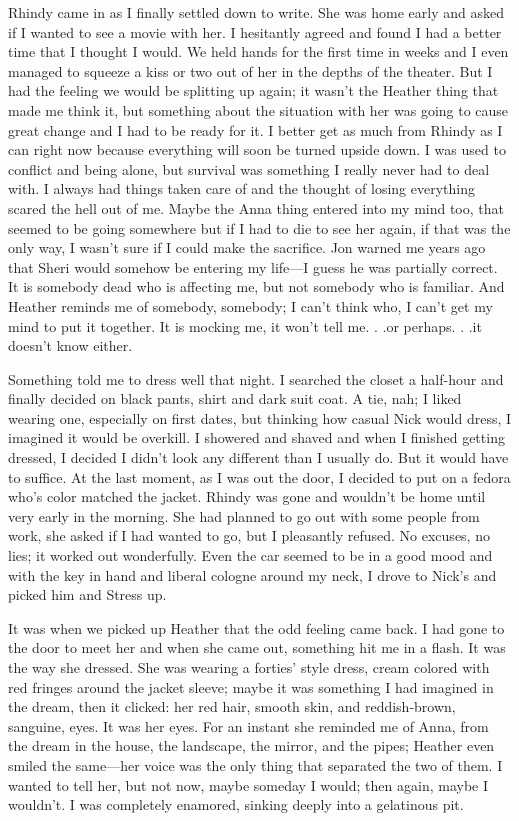 Rhindy came in as I finally settled down to write. She was home early
and asked if I wanted to see a movie with her. I hesitantly agreed and
found I had a better time that I thought I would. We held hands for the
first time in weeks and I even managed to squeeze a kiss or two out of
her in the depths of the theater. But I had the feeling we would be
splitting up again; it wasn't the Heather thing that made me think it,
but something about the situation with her was going to cause great
change and I had to be ready for it. I better get as much from Rhindy as
I can right now because everything will soon be turned upside down. I
was used to conflict and being alone, but survival was something I
really never had to deal with. I always had things taken care of and the
thought of losing everything scared the hell out of me. Maybe the Anna
thing entered into my mind too, that seemed to be going somewhere but if
I had to die to see her again, if that was the only way, I wasn't sure
if I could make the sacrifice. Jon warned me years ago that Sheri would
somehow be entering my life---I guess he was partially correct. It is
somebody dead who is affecting me, but not somebody who is familiar. And
Heather reminds me of somebody, somebody; I can't think who, I can't get
my mind to put it together. It is mocking me, it won't tell me. . .or
perhaps. . .it doesn't know either.

Something told me to dress well that night. I searched the closet a
half-hour and finally decided on black pants, shirt and dark suit coat.
A tie, nah; I liked wearing one, especially on first dates, but thinking
how casual Nick would dress, I imagined it would be overkill. I showered
and shaved and when I finished getting dressed, I decided I didn't look
any different than I usually do. But it would have to suffice. At the
last moment, as I was out the door, I decided to put on a fedora who's
color matched the jacket. Rhindy was gone and wouldn't be home until
very early in the morning. She had planned to go out with some people
from work, she asked if I had wanted to go, but I pleasantly refused. No
excuses, no lies; it worked out wonderfully. Even the car seemed to be
in a good mood and with the key in hand and liberal cologne around my
neck, I drove to Nick's and picked him and Stress up.

It was when we picked up Heather that the odd feeling came back. I had
gone to the door to meet her and when she came out, something hit me in
a flash. It was the way she dressed. She was wearing a forties' style
dress, cream colored with red fringes around the jacket sleeve; maybe it
was something I had imagined in the dream, then it clicked: her red
hair, smooth skin, and reddish-brown, sanguine, eyes. It was her eyes.
For an instant she reminded me of Anna, from the dream in the house, the
landscape, the mirror, and the pipes; Heather even smiled the same---her
voice was the only thing that separated the two of them. I wanted to
tell her, but not now, maybe someday I would; then again, maybe I
wouldn't. I was completely enamored, sinking deeply into a gelatinous
pit.

